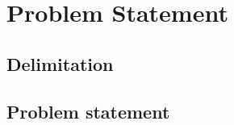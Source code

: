 \chapter{Problem Statement}

\section{Delimitation} \label{sec:Delimitation}
    

\section{Problem statement} \label{sec:problemStatement}
    
